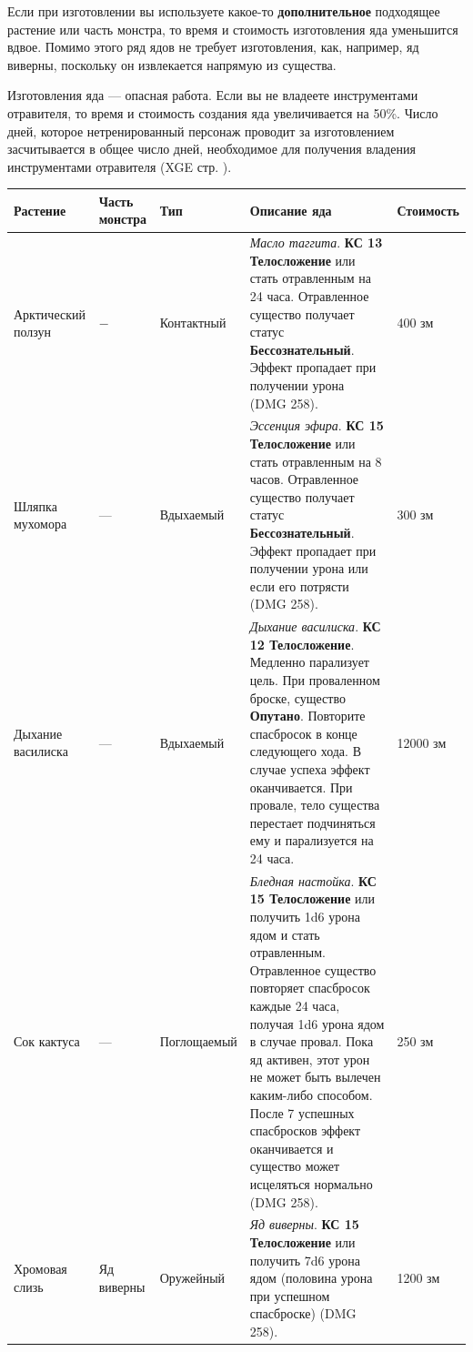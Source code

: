 \documentclass[a4paper, 9pt, twocolumn]{book}
\begin{document}
	Если при изготовлении вы используете какое-то \textbf{дополнительное} подходящее растение или часть монстра, то время и стоимость  изготовления яда уменьшится вдвое. Помимо этого ряд ядов не требует изготовления, как, например, яд виверны, поскольку он извлекается напрямую из существа.
	
	Изготовления яда --- опасная работа. Если вы не владеете инструментами отравителя, то время и стоимость создания яда увеличивается на 50\%. Число дней, которое нетренированный персонаж проводит за изготовлением засчитывается в общее число дней, необходимое для получения владения инструментами отравителя (XGE стр. ). %
	
	\begin{tabular}{|m{2cm}|m{2cm}|m{2cm}|m{8cm}|m{2cm}|}
		\hline
		\textbf{Растение} & \textbf{Часть монстра} & \textbf{Тип} & \textbf{Описание яда} & \textbf{Стоимость} \\
		\hline
		Арктический ползун & $-$ & Контактный & \textit{Масло таггита}. \textbf{КС 13 Телосложение} или стать отравленным на 24 часа. Отравленное существо получает статус \textbf{Бессознательный}. Эффект пропадает при получении урона (DMG 258). & 400 зм \\
		\hline
		Шляпка мухомора & --- & Вдыхаемый & \textit{Эссенция эфира}. \textbf{КС 15 Телосложение} или стать отравленным на 8 часов. Отравленное существо получает статус \textbf{Бессознательный}. Эффект пропадает при получении урона или если его потрясти (DMG 258). & 300 зм \\
		\hline
		Дыхание василиска & --- & Вдыхаемый & \textit{Дыхание василиска}. \textbf{КС 12 Телосложение}. Медленно парализует цель. При проваленном броске, существо \textbf{Опутано}. Повторите спасбросок в конце следующего хода. В случае успеха эффект оканчивается. При провале, тело существа перестает подчиняться ему и парализуется на 24 часа. & 12000 зм \\
		\hline
		Сок кактуса & --- & Поглощаемый & \textit{Бледная настойка}. \textbf{КС 15 Телосложение} или получить 1d6 урона ядом и стать отравленным. Отравленное существо повторяет спасбросок каждые 24 часа, получая 1d6 урона ядом в случае провал. Пока яд активен, этот урон не может быть вылечен каким-либо способом. После 7 успешных спасбросков эффект оканчивается и существо может исцеляться нормально (DMG 258). & 250 зм \\
		\hline
		Хромовая слизь & Яд виверны & Оружейный & \textit{Яд виверны}. \textbf{КС 15 Телосложение} или получить 7d6 урона ядом (половина урона при успешном спасброске) (DMG 258). & 1200 зм \\

\end{tabular}
\end{document}
